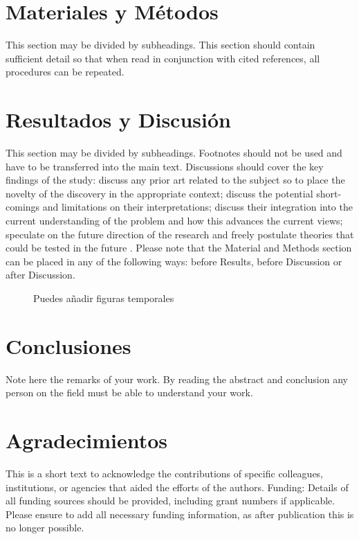 \documentclass[10pt, a4paper, twocolumn]{article}
\begin{document}
\section{Materiales y Métodos}
This section may be divided by subheadings. This section should contain sufficient detail so that when read in conjunction with cited references, all procedures can be repeated.

\section{Resultados y Discusión}
This section may be divided by subheadings. Footnotes should not be used and have to be transferred into the main text.
Discussions should cover the key findings of the study: discuss any prior art related to the subject so to place the novelty of the discovery in the appropriate context; discuss the potential short-comings and limitations on their interpretations; discuss their integration into the current understanding of the problem and how this advances the current views; speculate on the future direction of the research and freely postulate theories that could be tested in the future \cite{cengel, coleparmer, goulds}.
Please note that the Material and Methods section can be placed in any of the following ways: before Results, before Discussion or after Discussion.

\begin{figure}[htbp!]
	\centering
	\caption{Puedes añadir figuras temporales}
	\label{fig:placeholder}
\end{figure}

\section{Conclusiones}
Note here the remarks of your work. By reading the abstract and conclusion any person on the field must be able to understand your work.

\section*{Agradecimientos}
This is a short text to acknowledge the contributions of specific colleagues, institutions, or agencies that aided the efforts of the authors. 
Funding: Details of all funding sources should be provided, including grant numbers if applicable. Please ensure to add all necessary funding information, as after publication this is no longer possible.
\end{document}
